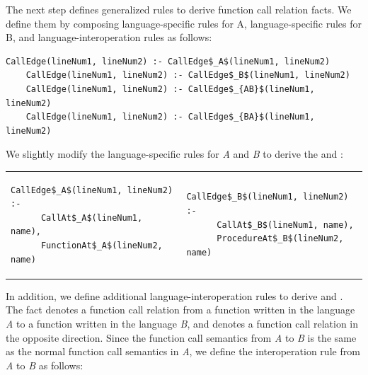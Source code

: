
The next step defines generalized rules to derive function call relation
facts. We define them by composing language-specific rules for A,
language-specific rules for B, and language-interoperation rules as follows:

\begin{lstlisting}[style=mrule]
    CallEdge(lineNum1, lineNum2) :- CallEdge$_A$(lineNum1, lineNum2)
    CallEdge(lineNum1, lineNum2) :- CallEdge$_B$(lineNum1, lineNum2)
    CallEdge(lineNum1, lineNum2) :- CallEdge$_{AB}$(lineNum1, lineNum2)
    CallEdge(lineNum1, lineNum2) :- CallEdge$_{BA}$(lineNum1, lineNum2)
\end{lstlisting}


\noindent 
We slightly modify the language-specific rules for {\it A} and {\it B} to
derive the  and :

\begin{tabular}{ll}
  {\begin{lstlisting}[style=mrule]
    CallEdge$_A$(lineNum1, lineNum2) :-
      CallAt$_A$(lineNum1, name),
      FunctionAt$_A$(lineNum2, name)
  \end{lstlisting}} & 
  {\begin{lstlisting}[style=mrule]
    CallEdge$_B$(lineNum1, lineNum2) :-
      CallAt$_B$(lineNum1, name),
      ProcedureAt$_B$(lineNum2, name)
  \end{lstlisting}}
\end{tabular}

\noindent
In addition, we define additional language-interoperation rules to derive  and . The fact  denotes a function call relation from a function written in
the language {\it A} to a function written in the language {\it B}, and  denotes a function call relation in the opposite direction.
Since the function call semantics from {\it A} to {\it B} is the same as the
normal function call semantics in {\it A}, we define the interoperation rule from {\it
A} to {\it B} as follows: 

